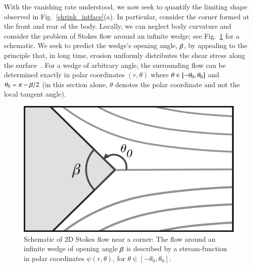 \documentclass[preprint, 10pt]{elsarticle}
\begin{document}
With the vanishing rate understood, we now seek to quantify the limiting shape observed in Fig.~\ref{shrink_intface}(a). In particular, consider the corner formed at the front and rear of the body. Locally, we can neglect body curvature and consider the problem of Stokes flow around an infinite wedge; see Fig.~\ref{corner} for a schematic. We seek to predict the wedge's opening angle, $\beta$, by appealing to the principle that, in long time, erosion uniformly distributes the shear stress along the surface~\cite{moo-ris-chi-zha-she2013, moore2017riemann}. For a wedge of arbitrary angle, the surrounding flow can be determined exactly in polar coordinates $(r, \theta)$ where $\theta \in [-\theta_0,\theta_0]$ and $\theta_0 = \pi - \beta/2$ (in this section alone, $\theta$ denotes the polar coordinate and not the local tangent angle). 

\begin{figure}%
\begin{center}
\includegraphics[width = 0.4 \textwidth]{./figs/corner.pdf}
\caption{Schematic of 2D Stokes flow near a corner: The flow around an infinite wedge of opening angle $\beta$ is described by a stream-function in polar coordinates $\psi(r,\theta)$, for $\theta \in [-\theta_0, \theta_0]$.}
\label{corner}
\end{center}
\end{figure}
 
\end{document}
